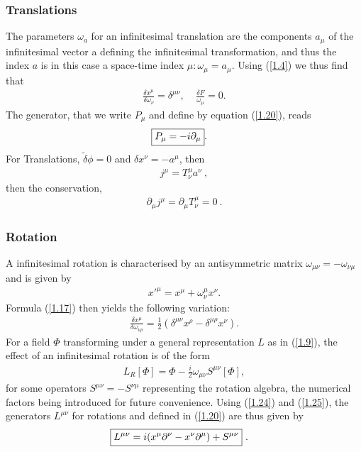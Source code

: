 \documentclass[12pt,a4paper]{report}
\begin{document}
\subsubsection{Translations}
The parameters $\omega_a$ for an infinitesimal translation are the components $a_\mu$ of the infinitesimal vector a defining the infinitesimal transformation, and thus the index $a$ is in this case a space-time index $\mu: \omega_\mu=a_\mu$. Using (\eqref{1.4}) we thus find that
\begin{align}
    \frac{\delta x^\mu}{\delta\omega_\nu}=\delta^{\mu\nu},~~~~~\frac{\delta F}{\omega_\mu}=0.
\end{align}
The generator, that we write $P_\mu$ and define by equation (\eqref{1.20}), reads
\begin{align}
    \Aboxed{P_\mu=-i\partial_\mu}.
\end{align}
For Translations, $\tilde{\delta}\phi=0$ and $\delta x^\nu=-a^\mu$,
then
\begin{align}
    j^\mu=T^\mu_\nu a^\nu~,
\end{align}
then the conservation, 
\begin{align}
    \partial_\mu j^\mu=\partial_\mu T^\mu_\nu =0~.
\end{align}
\subsubsection{Rotation}
A infinitesimal rotation is characterised by an antisymmetric matrix $\omega_{\mu\nu}=-\omega_{\nu\mu}$ and is given by
\begin{align}
    x'^\mu=x^\mu+\omega^\mu_\nu x^\nu.
\end{align}
Formula (\eqref{1.17}) then yields the following variation:
\begin{align}
    \frac{\delta x^\mu}{\delta \omega_{\nu\rho}}=\frac{1}{2}(\delta^{\mu\nu}x^\rho-\delta^{\mu\rho}x^\nu).\label{1.24}
\end{align}
For a field $\Phi$ transforming under a general representation $L$ as in (\eqref{1.9}), the effect of an
infinitesimal rotation is of the form
\begin{align}
    L_R[\Phi]=\Phi-\frac{i}{2}\omega_{\mu\nu}S^{\mu\nu}[\Phi],\label{1.25}
\end{align}
for some operators $S^{\mu\nu}=-S^{\nu\mu}$ representing the rotation algebra, the numerical factors being introduced for future convenience. Using (\eqref{1.24}) and (\eqref{1.25}), the generators $L^{\mu\nu}$ for rotations and defined in (\eqref{1.20}) are thus given by
\begin{align}
    \Aboxed{L^{\mu\nu}=i(x^\mu\partial^\nu-x^\nu\partial^\mu)+S^{\mu\nu}}~.
\end{align}
\end{document}
